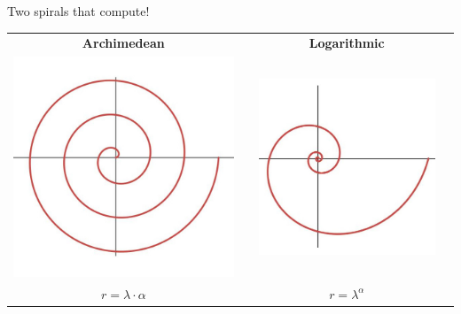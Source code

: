 \documentclass[14pt]{beamer}
\begin{document}

    \begin{frame}{Two spirals that compute!}
        \begin{center}
            \begin{tabular}{cccc}
                \textbf{Archimedean} & \qquad & \textbf{Logarithmic} & \quad \\[1ex]
                \includegraphics[width=20ex]{pictures/Arquimedes.jpg} & & 
                \includegraphics[width=20ex]{pictures/Logaritmica.jpg} & \\[1ex]
                {\Large $r = \lambda\cdot\alpha$ } & & {\Large $r = \lambda^\alpha$ } & \\
            \end{tabular}
        \end{center}
    \end{frame}

\end{document}
